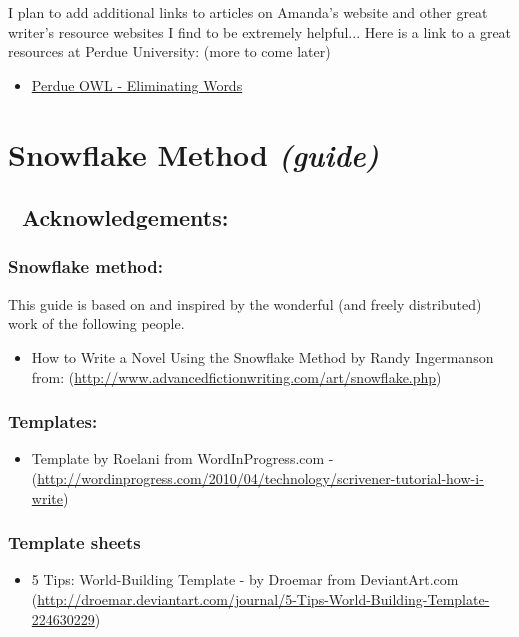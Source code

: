 \documentclass[openleft,oneside,showtrims]{memoir}
\begin{document}
I plan to add additional links to articles on Amanda's website and other great writer's resource websites I find to be extremely helpful...  Here is a link to a great resources at Perdue University:  (more to come later)

\begin{itemize}
\item \href{https://owl.purdue.edu/owl/general\_writing/academic\_writing/conciseness/eliminating\_words.html}{Perdue OWL - Eliminating Words}
\end{itemize}
\chapter{Snowflake Method \emph{(guide)}}
\label{sec:org0ee88f1}
\section{📃 Acknowledgements:}
\label{sec:orgc98cc47}
\subsection{Snowflake method:}
\label{sec:org82be931}

This guide is based on and inspired by the wonderful (and freely distributed) work of the following people.

\begin{itemize}
\item How to Write a Novel Using the Snowflake Method by Randy Ingermanson from: (\url{http://www.advancedfictionwriting.com/art/snowflake.php})
\end{itemize}

\subsection{Templates:}
\label{sec:org18043e4}

\begin{itemize}
\item Template by Roelani from WordInProgress.com - (\url{http://wordinprogress.com/2010/04/technology/scrivener-tutorial-how-i-write})
\end{itemize}

\subsection{Template sheets}
\label{sec:org2daae1d}

\begin{itemize}
\item 5 Tips: World-Building Template - by Droemar from DeviantArt.com (\url{http://droemar.deviantart.com/journal/5-Tips-World-Building-Template-224630229})
\end{itemize}
\end{document}
